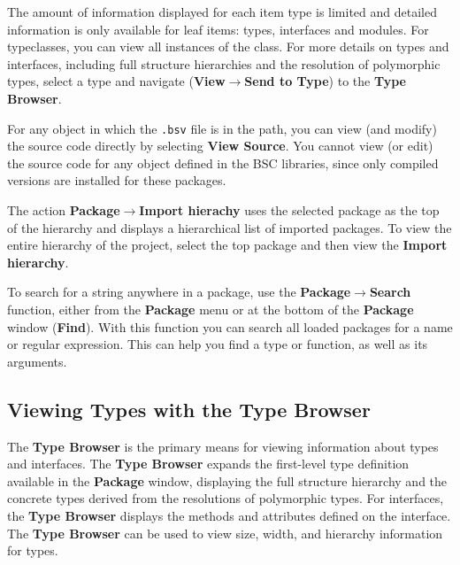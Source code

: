 \documentclass{article}
\newcommand{\te}[1]{\texttt{#1}}
\begin{document}
The amount of information
displayed for each item type is
limited and detailed information is only available for leaf items:
types, interfaces and modules.   For typeclasses, you can view all
instances of the class.  For more details on types  and interfaces,
including full structure hierarchies and the resolution of polymorphic
types, select a type and  navigate ({\bf View$\rightarrow$Send to Type})
to the  {\bf Type Browser}.



For any object in which the \te{.bsv}
file is in the path,  you can view (and modify) the source code
directly by selecting {\bf View Source}.     You cannot view (or edit) the source
code for any object defined in the BSC libraries, since only compiled versions are
installed for these packages.

The action {\bf Package$\rightarrow$Import hierachy} uses
 the selected package as the top of the hierarchy and  displays a
 hierarchical list of imported packages.
To view the entire hierarchy of the project, select the top package
 and then view the {\bf Import  hierarchy}.


To search for a string anywhere in a package, use the {\bf
Package$\rightarrow$Search} function, either from the {\bf Package} menu or at the
bottom of the {\bf Package} window ({\bf Find}).  With this function  you can
search all loaded packages for a name or regular expression.   This
can help you find a type or function, as well as its arguments.


\subsection{Viewing  Types with the Type Browser}
\label{window-type}

The {\bf Type Browser} is the primary means for viewing
 information about types and interfaces.
The {\bf Type Browser} expands the first-level type definition
available in the {\bf Package} window, displaying the
full structure hierarchy and  the concrete types derived from the
resolutions of polymorphic types.  For interfaces, the {\bf Type
Browser} displays the methods and  attributes defined on the
interface.  The {\bf Type Browser} can
be used to view  size, width, and hierarchy information for types.
\end{document}
